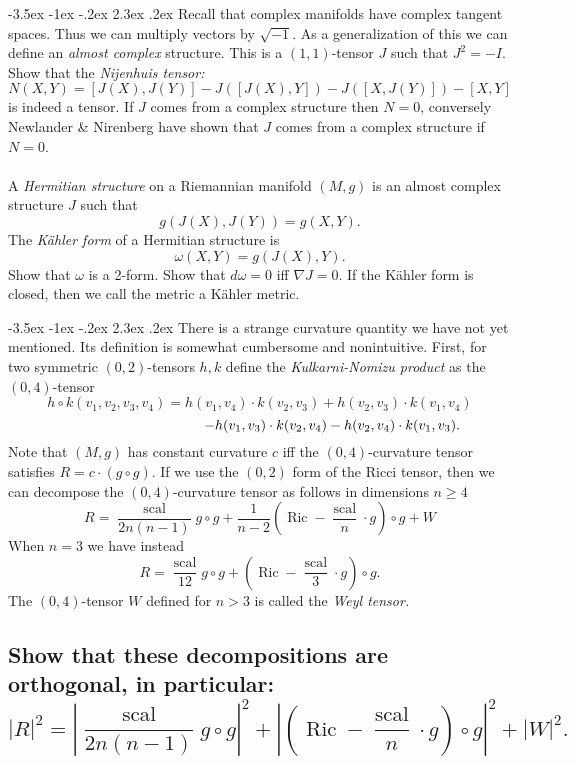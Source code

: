 \documentclass[10pt]{article}
\makeatletter
\renewcommand\section{\@startsection{section}{1}{\z@}%
                                  {-3.5ex \@plus -1ex \@minus -.2ex}%
                                  {2.3ex \@plus.2ex}%
                                  {\normalfont\large\bfseries}}
\DeclareMathOperator{\ric}{Ric}
\DeclareMathOperator{\scal}{scal}
\makeatother
\begin{document}
\section{Recall that complex manifolds have complex tangent spaces. Thus we can multiply vectors by $\sqrt {-1}$. As a generalization of this we can define an \emph{almost complex} structure. This is a $(1,1)$-tensor $J$ such that $J^2 =-I$. Show that the \emph{Nijenhuis tensor:} $$N(X,Y) = [J(X), J(Y)] - J([J(X),Y])- J([X,J(Y)]) - [X,Y]$$ is indeed a tensor. If $J$ comes from a complex structure then $N=0$, conversely Newlander \& Nirenberg have shown that $J$ comes from a complex structure if $N=0$.\\\\A \emph{Hermitian  structure} on a Riemannian manifold $(M,g)$ is an almost complex structure $J$ such that $$g(J(X), J(Y)) = g(X,Y).$$ The \emph{K\"ahler form} of a Hermitian structure is $$\omega(X,Y) = g(J(X),Y).$$ Show that $\omega$ is a 2-form. Show that $d \omega =0$ iff $\nabla J=0$. If the K\"ahler form is closed, then we call the metric a K\"ahler metric.}

\section{There is a strange curvature quantity we have not yet mentioned. Its definition is somewhat cumbersome and nonintuitive. First, for two symmetric $(0,2)$-tensors $h,k$ define the \emph{Kulkarni-Nomizu product} as the $(0,4)$-tensor $$h \circ k(v_1, v_2, v_3, v_4) = h(v_1,v_4) \cdot k(v_2, v_3) + h(v_2, v_3) \cdot k(v_1, v_4)$$ $$\hspace{3.65cm}- h(v_1, v_3) \cdot k(v_2, v_4) -h(v_2, v_4) \cdot k(v_1, v_3).$$ Note that $(M, g)$ has constant curvature $c$ iff the $(0,4)$-curvature tensor satisfies $R = c \cdot (g \circ g)$. If we use the $(0,2)$ form of the Ricci tensor, then we can decompose the $(0,4)$-curvature tensor as follows in dimensions $n \geq 4$ $$R = \frac{\scal}{2n ( n-1)} g \circ g + \frac{1}{n-2} \left( \ric - \frac{\scal}{n} \cdot g \right) \circ g + W $$ When $n=3$ we have instead $$ R = \frac{\scal}{12} g \circ g + \left( \ric - \frac{\scal}{3} \cdot g \right) \circ g.$$ The $(0,4)$-tensor $W$ defined for $n > 3$ is called the \emph{Weyl tensor.}}
\subsection{Show that these decompositions are orthogonal, in particular: $$|R|^2 = \left| \frac{\scal}{2n ( n-1)} g \circ g \right| ^2  + \left| \left( \ric - \frac{\scal}{n} \cdot g \right) \circ g \right|^2 + |W|^2.$$}
\end{document}
